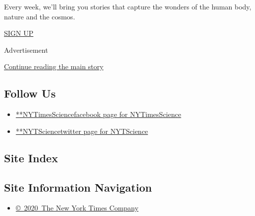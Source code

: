 Every week, we'll bring you stories that capture the wonders of the
human body, nature and the cosmos.

\href{/newsletters/signup/SC}{SIGN UP}

Advertisement

\protect\hyperlink{after-mktg}{Continue reading the main story}

\hypertarget{follow-us}{%
\subsection{Follow Us}\label{follow-us}}

\begin{itemize}
\tightlist
\item
  \href{https://www.facebook.com/NYTimesScience}{**NYTimesSciencefacebook
  page for NYTimesScience}
\item
  \href{https://twitter.com/NYTScience}{**NYTSciencetwitter page for
  NYTScience}
\end{itemize}

\hypertarget{site-index}{%
\subsection{Site Index}\label{site-index}}

\hypertarget{site-information-navigation}{%
\subsection{Site Information
Navigation}\label{site-information-navigation}}

\begin{itemize}
\tightlist
\item
  \href{https://help.nytimes.com/hc/en-us/articles/115014792127-Copyright-notice}{©~2020~The
  New York Times Company}
\end{itemize}

